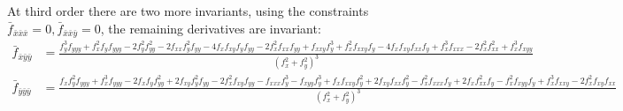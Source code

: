 \documentclass[review,onefignum,onetabnum]{siamonline190516}
\begin{document}
{At third order there are two more invariants, using the constraints
$\bar{f}_{\bar{x}\bar{x}\bar{x}} = 0, \bar{f}_{\bar{x}\bar{x}\bar{y}} = 0$,
the remaining derivatives are invariant:
\begin{align*}
    \bar{f}_{\bar{x}\bar{y}\bar{y}} &= \frac{f_y^3f_{yyy} + f_x^2f_yf_{yyy}
            -2f_y^2f_{yy}^2 - 2f_{xx}f_y^2f_{yy} -
            4f_xf_{xy}f_yf_{yy} - 2f_x^2 f_{xx}f_{yy} + f_{xxy}f_y^3 +
            f_x^2 f_{xxy}f_y - 4 f_x f_{xy} f_{xx} f_y + f_x^3 f_{xxx} -
        2f_x^2 f_{xx}^2 + f_x^3 f_{xyy}}{(f_x^2 + f_y^2)^3} \\
        \bar{f}_{\bar{y}\bar{y}\bar{y}} &= \frac{f_xf_y^2f_{yyy} +
        f_x^3f_{yyy} - 2f_x f_y f_{yy}^2 + 2f_{xy}f_y^2f_{yy} -
    2f_x^2f_{xy}f_{yy} - f_{xxx}f_y^3 - f_{xyy}f_y^3 + f_xf_{xxy}f_y^2 +
2f_{xy}f_{xx}f_y^2 - f_x^2 f_{xxx} f_y + 2f_xf_{xx}^2 f_y - f_x^2 f_{xyy}
f_y + f_x^3 f_{xxy} - 2f_x^2 f_{xy} f_{xx} }{(f_x^2 + f_y^2)^3 }
\end{align*}





}
\end{document}

